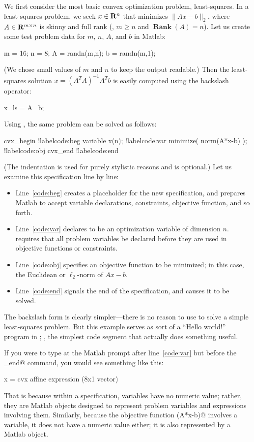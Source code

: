 \documentclass[12pt]{article}
\def\Rank{\operatorname*{\textbf{Rank}}}
\begin{document}
We first consider the most basic convex optimization problem,
least-squares.
In a least-squares problem, we seek $x \in \R^n$
that minimizes $\|Ax-b\|_2$, where $A\in \R^{m \times n}$ is
skinny and full rank (\ie, $m\geq n$ and $\Rank (A)=n$).
Let us create some test problem data for $m$, $n$, $A$, and $b$ in Matlab:
\begin{code2}[firstnumber=15]
	m = 16; n = 8;
	A = randn(m,n);
	b = randn(m,1);
\end{code2}
(We chose small values of $m$ and $n$ to keep the output readable.)
Then the least-squares solution  $x=(A^TA)^{-1}A^Tb$ is easily
computed using the backslash operator: 
\begin{code2}[firstnumber=20]
	x_ls = A \ b;
\end{code2}
Using \cvx, the same problem can be solved as follows:
\begin{code2}[firstnumber=23]
	cvx_begin			!label{code:beg}
	    variable x(n);		!label{code:var}
	    minimize( norm(A*x-b) );	!label{code:obj}
	cvx_end				!label{code:end}
\end{code2}
(The indentation is used for purely stylistic reasons and is optional.) 
Let us examine this specification line by line:
\begin{itemize}
\item Line~\ref{code:beg} creates a placeholder for the
new \cvx specification, and prepares Matlab to accept 
variable declarations, constraints, objective function, and so forth. 
\item Line~\ref{code:var} declares \verb@x@
to be an optimization variable of dimension $n$. \cvx
requires that all problem variables be declared before they are used in
objective functions or constraints. 
\item Line~\ref{code:obj}
specifies an objective function to be minimized; in this case,
the Euclidean or $\ell_2$-norm
of $Ax-b$. 
\item Line~\ref{code:end} signals the end of the \cvx specification,
and causes it to be solved.
\end{itemize}
The backslash form is clearly simpler---there is no reason to use \cvx
to solve a simple least-squares problem. But this
example serves as sort of a ``Hello world!'' program in \cvx;
\ie, the simplest code segment that actually does something useful.

If you were to type \verb@x@ at the
Matlab prompt after line~\ref{code:var} but
before the \verb@cvx_end@ command, you would see something
like this:
\begin{code}
	x =
	    cvx affine expression (8x1 vector)
\end{code}
That is because within a specification, variables have no
numeric value; rather, they are Matlab objects 
designed to represent problem variables and expressions
involving them. Similarly, 
because the objective function \verb@norm(A*x-b)@ 
involves a \cvx variable, it does not have a numeric value either; 
it is also represented by a Matlab object.
\end{document}
